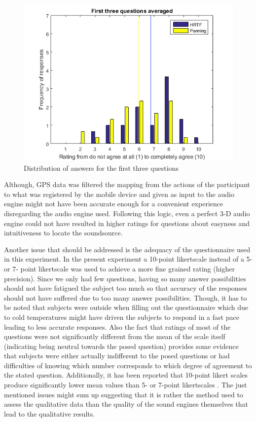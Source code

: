 \documentclass[journal]{IEEEtran}
\begin{document}
\begin{figure}[h!]
  \centering
    \includegraphics[scale=0.7]{graphics/qq13.png}
   \caption{Distribution of answers for the first three questions}
  \label{fig:histqq13}
\end{figure}

Although, GPS data was filtered the mapping from the actions of the participant to what was registered by the mobile device and given as input to the audio engine might not have been accurate enough for a convenient experience disregarding the audio engine used. Following this logic, even a perfect 3-D audio engine could not have resulted in higher ratings for questions about easyness and intuitiveness to locate the soundsource.

Another issue that should be addressed is the adequacy of the questionnaire used in this experiment. In the present experiment a 10-point likertscale instead of  a 5- or 7- point likertscale was used to achieve a more fine grained rating (higher precision). Since we only had few questions, having so many answer possibilities should not have fatigued the subject too much so that accuracy of the responses should not have suffered due to too many answer possibilities. Though, it has to be noted that subjects were outside when filling out the questionnaire which due to cold temperatures might have driven the subjects to respond in a fast pace leading to less accurate responses. Also the fact that ratings of most of the questions were not significantly different from the mean of the scale itself (indicating being neutral towards the posed question) provides some evidence that subjects were either actually indifferent to the posed questions or had difficulties of knowing which number corresponds to which degree of agreement to the stated question. Additionally, it has been reported that 10-point likert scales produce significantly lower mean values than 5- or 7-point likertscales \cite{Dawes2012}. The just mentioned issues might sum up suggesting that it is rather the method used to assess the qualitative data than the quality of the sound engines themselves that lead to the qualitative results. 
\end{document}
